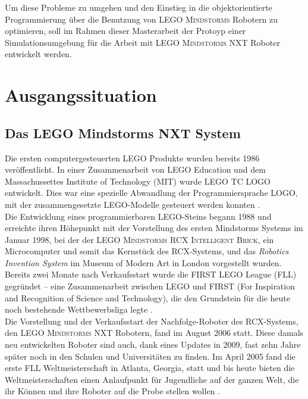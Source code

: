 \documentclass[paper=a4, pagesize, DIV=calc, BCOR=15.5mm, twoside=on, onecolumn=on, open = right, titlepage =on, parskip =half-, headsepline = on, footsepline = on, chapterprefix = on, appendixprefix = off, fontsize = 12pt, numbers = noenddot, abstract = on]{scrbook}
\numberwithin{equation}{chapter}
\theoremstyle{definition}
\theoremstyle{plain}
\theoremstyle{plain}
\theoremstyle{remark}
\theoremstyle{plain}
\theoremstyle{plain}
\begin{document}
Um diese Probleme zu umgehen und den Einstieg in die objektorientierte Programmierung über die Benutzung von \textsc{LEGO Mindstorms} Robotern zu optimieren, soll im Rahmen dieser Masterarbeit der Protoyp einer Simulationsumgebung für die Arbeit mit \textsc{LEGO Mindstorms} NXT Roboter entwickelt werden.
\newpage
\par\singlespacing
\chapter{Ausgangssituation}

\par\singlespacing
\section{Das LEGO Mindstorms NXT System}
\onehalfspacing
Die ersten computergesteuerten \textsc{LEGO} Produkte wurden bereits 1986 veröffentlicht. In einer Zusammenarbeit von \textsc{LEGO} Education und dem Massachussettes Institute of Technology (MIT) wurde \textsc{LEGO TC LOGO} entwickelt. Dies war eine spezielle Abwandlung der Programmiersprache LOGO, mit der zusammengesetzte \textsc{LEGO}-Modelle gesteuert werden konnten \cite{rolling:14}.\\
Die Entwicklung eines programmierbaren \textsc{LEGO}-Steins begann 1988 und erreichte ihren Höhepunkt mit der Vorstellung des ersten Mindstorms Systems im Januar 1998, bei der der \textsc{LEGO Mindstorms RCX Intelligent Brick}, ein Microcomputer und somit das Kernstück des RCX-Systems, und das \emph{Robotics Invention System} im Museum of Modern Art in London vorgestellt wurden.\\
Bereits zwei Monate nach Verkaufsstart wurde die FIRST LEGO League (FLL) gegründet -- eine Zusammenarbeit zwischen \textsc{LEGO} und FIRST (For Inspiration and Recognition of Science and Technology), die den Grundstein für die heute noch bestehende Wettbewerbsliga legte \cite{rolling:14}.\\
Die Vorstellung und der Verkaufsstart der Nachfolge-Roboter des RCX-Systems, den \textsc{LEGO Mindstorms} NXT Robotern, fand im August 2006 statt. Diese damals neu entwickelten Roboter sind auch, dank eines Updates in 2009, fast zehn Jahre später noch in den Schulen und Universitäten zu finden. Im April 2005 fand die erste FLL Weltmeisterschaft in Atlanta, Georgia, statt und bis heute bieten die Weltmeisterschaften einen Anlaufpunkt für Jugendliche auf der ganzen Welt, die ihr Können und ihre Roboter auf die Probe stellen wollen \cite{lego}.
\end{document}
